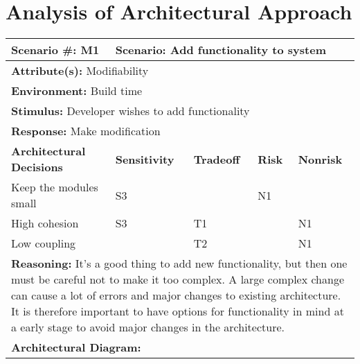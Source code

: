 \section{Analysis of Architectural Approach}


\begin{tabular}{|m{}|m{}|m{}|m{}|m{}|m{}|}
  \hline
  {\bf Scenario \#:} M1 & \multicolumn{5}{m{0.75 \textwidth}|}{{\bf Scenario:} Add functionality to system} \\ \hline
  \multicolumn{6}{|m{0.9 \textwidth}|}{{\bf Attribute(s):} Modifiability} \\ \hline
  \multicolumn{6}{|m{0.9 \textwidth}|}{{\bf Environment:} Build time} \\ \hline
  \multicolumn{6}{|m{0.9 \textwidth}|}{{\bf Stimulus:} Developer wishes to add functionality} \\ \hline
  \multicolumn{6}{|m{0.9 \textwidth}|}{{\bf Response:} Make modification} \\ \hline
  \multicolumn{2}{|m{0.3 \textwidth}|}{\bf Architectural Decisions} & {\bf Sensitivity} & {\bf Tradeoff} & {\bf Risk} & {\bf Nonrisk} \\ \hline
  \multicolumn{2}{|m{0.3 \textwidth}|}{Keep the modules small} & S3 &  & N1 &  \\ \hline
  \multicolumn{2}{|m{0.3 \textwidth}|}{High cohesion} & S3 & T1 &  & N1 \\ \hline
  \multicolumn{2}{|m{0.3 \textwidth}|}{Low coupling} &  & T2 &  & N1 \\ \hline
  \multicolumn{6}{|m{0.9 \textwidth}|}{{\bf Reasoning:} It's a good thing to add new functionality, but then one must be careful not to make 
    it too complex. A large complex change can cause a lot of errors and major changes to existing architecture. It is therefore important
    to have options for functionality in mind at a early stage to avoid major changes in the architecture.} \\ \hline
  \multicolumn{6}{|m{0.9 \textwidth}|}{{\bf Architectural Diagram:} } \\ \hline
\end{tabular}




